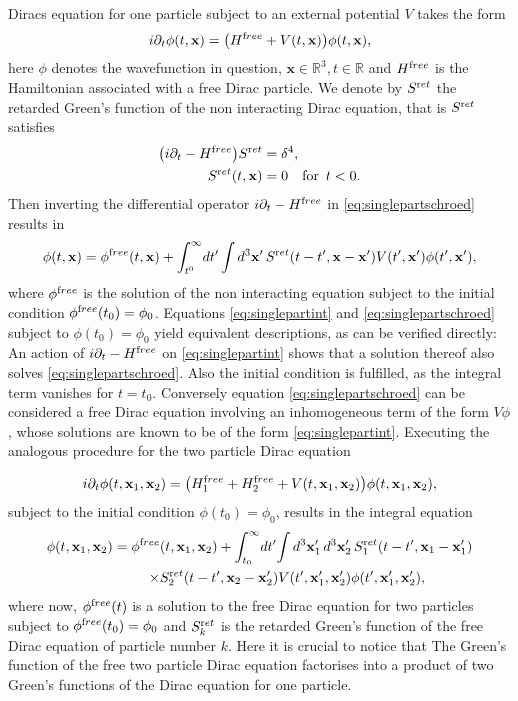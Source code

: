 \documentclass[b5paper,draft,openbib,12pt]{memoir}
\newcommand{\vx}{\mathbf{x}}
\newcommand{\ret}{{\textup ret}}
\newcommand{\free}{{\textup free}}
\begin{document}
Diracs equation for one particle subject to an 
external potential \(V\) takes the form
\begin{equation}
	i \partial_t \phi(t,\vx) = \big( H^\free + V(t,\vx) \big) \phi(t,\vx),
	\label{eq:singlepartschroed}
\end{equation}
here \(\phi\) denotes the wavefunction in question, \(\vx\in\mathbb{R}^3, t\in\mathbb{R}\)
and \(H^\free\) is the Hamiltonian associated with a free Dirac particle.
We denote by \(S^\ret\) the retarded Green's function of the non interacting Dirac equation,
that is \(S^\ret\) satisfies
\begin{align}\label{eq:schroedgreensfn}
  \big( i \partial_t - H^\free \big) S^\ret &= \delta^4,\\
  S^\ret(t,\vx) &= 0 \quad \text{for }\, t<0.
\end{align}
Then inverting the differential operator \(i\partial_t -H^\free\) in  \eqref{eq:singlepartschroed}
results in 
\begin{equation}
	\phi(t,\vx) = \phi^\free(t,\vx) + \int_{t^0}^\infty \! dt' \int d^3 \vx' \, S^\ret(t-t',\vx-\vx') V(t',\vx') \phi(t',\vx'),
	\label{eq:singlepartint}
\end{equation}
where $\phi^\free$ 
is the solution of the non interacting equation subject to the 
initial condition \(\phi^\free(t_0)=\phi_0\). 
Equations \eqref{eq:singlepartint} and \eqref{eq:singlepartschroed} subject to 
\(\phi(t_0)=\phi_0\) yield equivalent 
descriptions, as can be verified directly: An action of \(i\partial_t -H^\free\) on 
\eqref{eq:singlepartint} shows that a solution thereof also solves \eqref{eq:singlepartschroed}.
Also the initial condition is fulfilled, as the integral term vanishes for \(t=t_0\).
Conversely equation \eqref{eq:singlepartschroed} can be considered a free Dirac equation 
involving an inhomogeneous term of the form \(V \phi\), whose solutions are known to be
of the form \eqref{eq:singlepartint}.
Executing the analogous procedure for the two particle Dirac equation

\begin{equation}
	i \partial_t \phi(t,\vx_1,\vx_2) = \big(H_1^\free + H_2^\free + V(t,\vx_1,\vx_2)\big) \phi(t,\vx_1,\vx_2),
	\label{eq:twopartschroed}
\end{equation}
subject to the initial condition  \(\phi(t_0)=\phi_0\), 
results in the integral equation
\begin{align}
	\phi(t,\vx_1,\vx_2) = \phi^\free&(t,\vx_1,\vx_2) + \int_{t_0}^\infty \! dt' \! \int d^3 \vx_1'\,  d^3 \vx_2'\, S_1^\ret(t-t',\vx_1-\vx_1') \nonumber\\
	\times&S_2^\ret(t-t',\vx_2-\vx_2') V(t',\vx_1',\vx_2') \phi(t',\vx_1',\vx_2'),
	\label{eq:twopartschroedint}
\end{align}
where  now,
$\phi^\free(t)$ is a solution to the free Dirac 
equation for two particles subject
to \(\phi^\free (t_0)=\phi_0\) and \(S_k^\ret\) is 
the retarded Green's function
of the free Dirac equation of particle number \(k\). 
Here it is crucial to notice that
The Green's function of the free two particle Dirac equation 
factorises into a product 
of two Green's functions of the Dirac equation for one particle.
\end{document}
